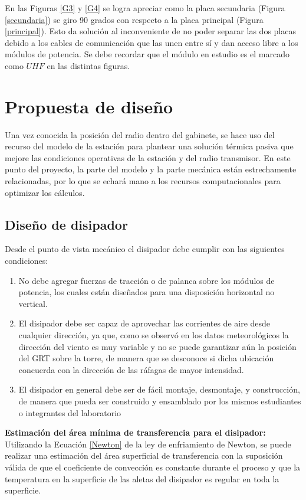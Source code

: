 En las Figuras \ref{G3} y \ref{G4} se logra apreciar como la placa secundaria (Figura \ref{secundaria}) se giro 90 grados con respecto a la placa principal (Figura \ref{principal}). Esto da solución al inconveniente de no poder separar las dos placas debido a los cables de comunicación que las unen entre sí y dan acceso libre a los módulos de potencia. Se debe recordar que el módulo en estudio es el marcado como $UHF$ en las distintas figuras.

\section{Propuesta de diseño}

Una vez conocida la posición del radio dentro del gabinete, se hace uso del recurso del modelo de la estación para plantear una solución térmica pasiva que mejore las condiciones operativas de la estación y del radio transmisor. En este punto del proyecto, la parte del modelo y la parte mecánica están estrechamente relacionadas, por lo que se echará mano a los recursos computacionales para optimizar los cálculos.

\subsection{Diseño de disipador}

Desde el punto de vista mecánico el disipador debe cumplir con las siguientes condiciones:

\begin{enumerate}
    \item No debe agregar fuerzas de tracción o de palanca sobre los módulos de potencia, los cuales están diseñados para una disposición horizontal no vertical.
    \item El disipador debe ser capaz de aprovechar las corrientes de aire desde cualquier dirección, ya que, como se observó en los datos meteorológicos la dirección del viento es muy variable y no se puede garantizar aún la posición del GRT sobre la torre, de manera que se desconoce si dicha ubicación concuerda con la dirección de las ráfagas de mayor intensidad.
    \item El disipador en general debe ser de fácil montaje, desmontaje, y construcción, de manera que pueda ser construido y ensamblado por los mismos estudiantes o integrantes del laboratorio 
\end{enumerate}

\textbf{Estimación del área mínima de transferencia para el disipador:} Utilizando la Ecuación \ref{Newton} de la ley de enfriamiento de Newton, se puede realizar una estimación del área superficial de transferencia con la suposición válida de que el coeficiente de convección es constante durante el proceso y que la temperatura en la superficie de las aletas del disipador es regular en toda la superficie. \cite{cengel}

